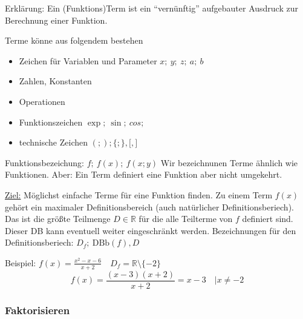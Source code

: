 Erklärung: Ein (Funktions)Term ist ein ``vernünftig'' aufgebauter Ausdruck zur Berechnung einer Funktion.

Terme könne aus folgendem bestehen
\begin{itemize}
    \item Zeichen für Variablen und Parameter $x;\ y;\ z;\ a;\ b$
    \item Zahlen, Konstanten
    \item Operationen
    \item Funktionszeichen $\exp;\ \sin;\ cos;\ $
    \item technische Zeichen $(;);\lbrace;\rbrace,\lbrack,\rbrack$
\end{itemize}
Funktionsbezeichung: $f;\ f(x);\ f(x;y)$ Wir bezeichnunen Terme ähnlich wie Funktionen.
Aber: Ein Term definiert eine Funktion aber nicht umgekehrt.


\underline{Ziel:} Möglichst einfache Terme für eine Funktion finden.
Zu einem Term $f(x)$ gehört ein maximaler Definitionsbereich (auch natürlicher Definitionsberiech).
Das ist die größte Teilmenge $D \in \mathbb{R}$ für die alle Teilterme von $f$ definiert sind.
Dieser DB kann eventuell weiter eingeschränkt werden.
Bezeichnungen für den Definitionsberiech: $D_f;\ \textrm{DBb}(f), D$


Beispiel: $f(x) = \frac{x^2-x-6}{x+2}\quad D_f=\mathbb{R}\setminus\lbrace-2\rbrace$
\[f(x)= \frac{(x-3)(x+2)}{x+2} = x-3\quad | x \not = -2\]

\subsubsection{Faktorisieren}

